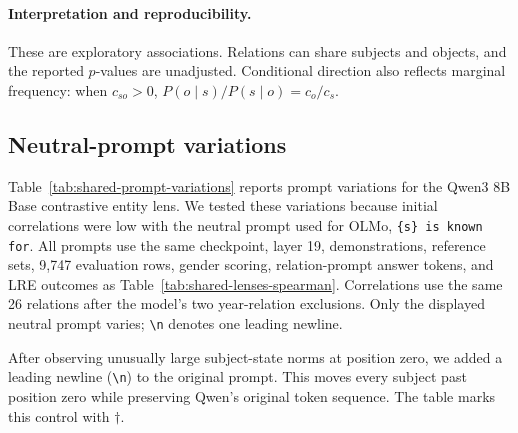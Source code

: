 \paragraph{Interpretation and reproducibility.}
These are exploratory associations. Relations can share subjects and
objects, and the reported $p$-values are unadjusted. Conditional direction
also reflects marginal frequency: when $c_{so}>0$, $P(o\mid s)/P(s\mid o)=c_o/c_s$.


\clearpage
\subsection{Neutral-prompt variations}
\label{sec:prompt-variations}

Table~\ref{tab:shared-prompt-variations} reports prompt variations for the
Qwen3 8B Base contrastive entity lens. We tested these variations because
initial correlations were low with the neutral prompt used for OLMo,
\texttt{\{s\} is known for}. All prompts use the same checkpoint,
layer 19, demonstrations, reference sets, 9,747 evaluation rows, gender scoring,
relation-prompt answer tokens, and LRE outcomes as
Table~\ref{tab:shared-lenses-spearman}. Correlations use the same 26 relations
after the model's two year-relation exclusions. Only the displayed neutral
prompt varies; \texttt{\textbackslash n} denotes one leading newline.

After observing unusually large subject-state norms at position zero, we
added a leading newline (\texttt{\textbackslash n}) to the original prompt.
This moves every subject past position zero while preserving Qwen's original
token sequence. The table marks this control with $\dagger$.


